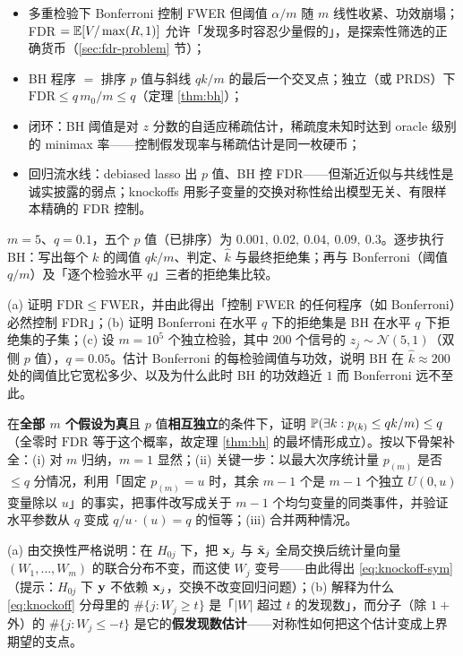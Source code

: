 \begin{keybox}[本章要点]
\begin{itemize}
  \item 多重检验下 Bonferroni 控制 FWER 但阈值 $\alpha/m$ 随 $m$ 线性收紧、功效崩塌；FDR $= \mathbb{E}[V/\max(R,1)]$ 允许「发现多时容忍少量假的」，是探索性筛选的正确货币（\ref{sec:fdr-problem} 节）；
  \item BH 程序 $=$ 排序 $p$ 值与斜线 $qk/m$ 的最后一个交叉点；独立（或 PRDS）下 $\mathrm{FDR} \le q\, m_0/m \le q$（定理 \ref{thm:bh}）；
  \item 闭环：BH 阈值是对 $z$ 分数的自适应稀疏估计，稀疏度未知时达到 oracle 级别的 minimax 率\cite{abramovich2006}——控制假发现率与稀疏估计是同一枚硬币；
  \item 回归流水线：debiased lasso 出 $p$ 值、BH 控 FDR——但渐近近似与共线性是诚实披露的弱点；knockoffs 用影子变量的交换对称性给出模型无关、有限样本精确的 FDR 控制\cite{barber2015}。
\end{itemize}
\end{keybox}

\begin{exercise}\label{ex:bh-hand}
$m = 5$、$q = 0.1$，五个 $p$ 值（已排序）为 $0.001,\ 0.02,\ 0.04,\ 0.09,\ 0.3$。逐步执行 BH：写出每个 $k$ 的阈值 $qk/m$、判定、$\hat{k}$ 与最终拒绝集；再与 Bonferroni（阈值 $q/m$）及「逐个检验水平 $q$」三者的拒绝集比较。
\end{exercise}

\begin{exercise}\label{ex:bh-bonf}
(a) 证明 $\mathrm{FDR} \le \mathrm{FWER}$，并由此得出「控制 FWER 的任何程序（如 Bonferroni）必然控制 FDR」；(b) 证明 Bonferroni 在水平 $q$ 下的拒绝集是 BH 在水平 $q$ 下拒绝集的子集；(c) 设 $m = 10^5$ 个独立检验，其中 $200$ 个信号的 $z_j \sim \mathcal{N}(5, 1)$（双侧 $p$ 值），$q = 0.05$。估计 Bonferroni 的每检验阈值与功效，说明 BH 在 $\hat{k} \approx 200$ 处的阈值比它宽松多少、以及为什么此时 BH 的功效趋近 $1$ 而 Bonferroni 远不至此。
\end{exercise}

\begin{exercise}[证明梗概，较难]\label{ex:bh-proof}
在\textbf{全部 $m$ 个假设为真}且 $p$ 值\textbf{相互独立}的条件下，证明 $\mathbb{P}( \exists k : p_{(k)} \le qk/m ) \le q$（全零时 $\mathrm{FDR}$ 等于这个概率，故定理 \ref{thm:bh} 的最坏情形成立）。按以下骨架补全：(i) 对 $m$ 归纳，$m = 1$ 显然；(ii) 关键一步：以最大次序统计量 $p_{(m)}$ 是否 $\le q$ 分情况，利用「固定 $p_{(m)} = u$ 时，其余 $m-1$ 个是 $m-1$ 个独立 $U(0, u)$ 变量除以 $u$」的事实，把事件改写成关于 $m-1$ 个均匀变量的同类事件，并验证水平参数从 $q$ 变成 $q/u \cdot (u) = q$ 的恒等；(iii) 合并两种情况。
\end{exercise}

\begin{exercise}\label{ex:knockoff}
(a) 由交换性严格说明：在 $H_{0j}$ 下，把 $\mathbf{x}_j$ 与 $\tilde{\mathbf{x}}_j$ 全局交换后统计量向量 $(W_1, \dots, W_m)$ 的联合分布不变，而这使 $W_j$ 变号——由此得出 \eqref{eq:knockoff-sym}（提示：$H_{0j}$ 下 $\mathbf{y}$ 不依赖 $\mathbf{x}_j$，交换不改变回归问题）；(b) 解释为什么 \eqref{eq:knockoff} 分母里的 $\#\{j : W_j \ge t\}$ 是「$|W|$ 超过 $t$ 的发现数」，而分子（除 $1+$ 外）的 $\#\{j : W_j \le -t\}$ 是它的\textbf{假发现数估计}——对称性如何把这个估计变成上界期望的支点。
\end{exercise}
